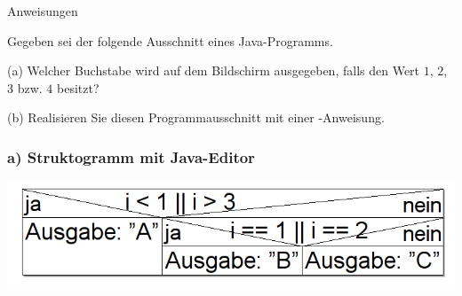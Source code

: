 \begin{frame}[t]%
\medskip

\begin{exercise}{Anweisungen}
\begin{body}
Gegeben sei der folgende Ausschnitt eines Java-Programms.


\begin{parts}
\item[(a)] Welcher Buchstabe wird auf dem Bildschirm ausgegeben, falls  den Wert $1$, $2$, $3$ bzw. $4$ besitzt?
\item[(b)] Realisieren Sie diesen Programmausschnitt mit einer -Anweisung.
\end{parts}
\end{body}
\end{exercise}

\end{frame}


\begin{frame}[fragile]%
 \frametitle{a) Struktogramm mit Java-Editor}%

\begin{center}

\includegraphics[width=1\textwidth]{anweis-2/Bilder/Struktogramm_a}
\end{center}
\end{frame}


